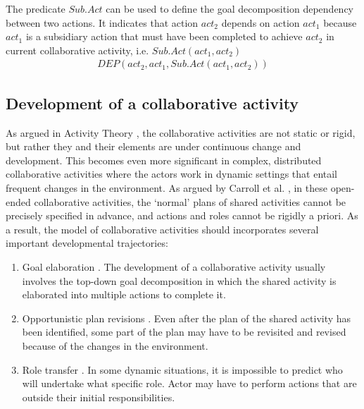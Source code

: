 The predicate $Sub.Act$ can be used to define the goal decomposition dependency between two actions. It indicates that action $act_2$ depends on action $act_1$ because $act_1$ is a subsidiary action that must have been completed to achieve $act_2$ in current collaborative activity, i.e. $Sub.Act(act_1, act_2)$
\begin{align*} 
	 DEP(act_2, act_1, Sub.Act(act_1, act_2))
\end{align*}

\subsection{Development of a collaborative activity} %
\label{sub:development_of_a_collaborative_activity}
As argued in Activity Theory \cite{nardi1996context}, the collaborative activities are not static or rigid, but rather they and their elements are under continuous change and development. This becomes even more significant in complex, distributed collaborative activities where the actors work in dynamic settings that entail frequent changes in the environment. As argued by Carroll et al. \cite{carroll2006a}, in these open-ended collaborative activities, the `normal' plans of shared activities cannot be precisely specified in advance, and actions and roles cannot be rigidly a priori. As a result, the model of collaborative activities should incorporates several important developmental trajectories:

\begin{enumerate}
 	\item Goal elaboration \cite{Grosz2006}. The development of a collaborative activity usually involves the top-down goal decomposition in which the shared activity is elaborated into multiple actions to complete it. 
 	\item Opportunistic plan revisions \cite{suchman1987plans}. Even after the plan of the shared activity has been identified, some part of the plan may have to be revisited and revised because of the changes in the environment.
 	\item Role transfer \cite{Turoff2004}. In some dynamic situations, it is impossible to predict who will undertake what specific role. Actor may have to perform actions that are outside their initial responsibilities.
 \end{enumerate} 

